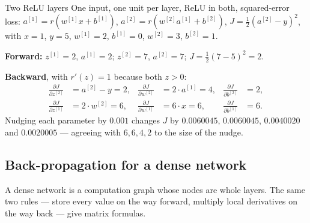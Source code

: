 \begin{workedexample}{Two ReLU layers}
One input, one unit per layer, ReLU in both, squared-error loss:
$a^{[1]} = r(w^{[1]}x + b^{[1]})$, $a^{[2]} = r(w^{[2]}a^{[1]} + b^{[2]})$,
$J = \frac12(a^{[2]} - y)^2$, with $x = 1$, $y = 5$, $w^{[1]} = 2$, $b^{[1]} = 0$,
$w^{[2]} = 3$, $b^{[2]} = 1$.

\textbf{Forward:} $z^{[1]} = 2$, $a^{[1]} = 2$; $z^{[2]} = 7$, $a^{[2]} = 7$;
$J = \frac12(7-5)^2 = 2$.

\textbf{Backward}, with $r'(z) = 1$ because both $z > 0$:
\[
\begin{aligned}
  \frac{\partial J}{\partial z^{[2]}} &= a^{[2]} - y = 2, &
  \frac{\partial J}{\partial w^{[2]}} &= 2\cdot a^{[1]} = 4, &
  \frac{\partial J}{\partial b^{[2]}} &= 2,\\
  \frac{\partial J}{\partial z^{[1]}} &= 2\cdot w^{[2]} = 6, &
  \frac{\partial J}{\partial w^{[1]}} &= 6\cdot x = 6, &
  \frac{\partial J}{\partial b^{[1]}} &= 6 .
\end{aligned}
\]
Nudging each parameter by $0.001$ changes $J$ by $0.0060045$, $0.0060045$,
$0.0040020$ and $0.0020005$ --- agreeing with $6, 6, 4, 2$ to the size of the
nudge.
\end{workedexample}

\subsection{Back-propagation for a dense network}

A dense network is a computation graph whose nodes are whole layers. The same
two rules --- store every value on the way forward, multiply local derivatives
on the way back --- give matrix formulas.

